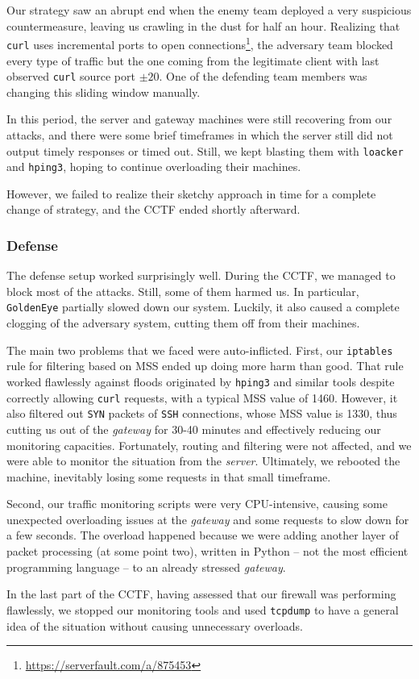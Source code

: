 Our strategy saw an abrupt end when the enemy team deployed a very suspicious countermeasure, leaving us crawling in the dust for half an hour. Realizing that \texttt{curl} uses incremental ports to open connections\footnote{\url{https://serverfault.com/a/875453}}, the adversary team blocked every type of traffic but the one coming from the legitimate client with last observed \texttt{curl} source port $\pm 20$. One of the defending team members was changing this sliding window manually. 

In this period, the server and gateway machines were still recovering from our attacks, and there were some brief timeframes in which the server still did not output timely responses or timed out. Still, we kept blasting them with \texttt{loacker} and \texttt{hping3}, hoping to continue overloading their machines.

However, we failed to realize their sketchy approach in time for a complete change of strategy, and the CCTF ended shortly afterward.

\subsubsection{Defense}
\label{sec:cctf-resilient:exec:def}

The defense setup worked surprisingly well. During the CCTF, we managed to block most of the attacks. Still, some of them harmed us. In particular, \texttt{GoldenEye} partially slowed down our system. Luckily, it also caused a complete clogging of the adversary system, cutting them off from their machines.

The main two problems that we faced were auto-inflicted. First, our \texttt{iptables} rule for filtering based on MSS ended up doing more harm than good. That rule worked flawlessly against floods originated by \texttt{hping3} and similar tools despite correctly allowing \texttt{curl} requests, with a typical MSS value of 1460. However, it also filtered out \texttt{SYN} packets of \texttt{SSH} connections, whose MSS value is 1330, thus cutting us out of the \textit{gateway} for 30-40 minutes and effectively reducing our monitoring capacities. Fortunately, routing and filtering were not affected, and we were able to monitor the situation from the \textit{server}. Ultimately, we rebooted the machine, inevitably losing some requests in that small timeframe.

Second, our traffic monitoring scripts were very CPU-intensive, causing some unexpected overloading issues at the \textit{gateway} and some requests to slow down for a few seconds.
The overload happened because we were adding another layer of packet processing (at some point two), written in Python -- not the most efficient programming language -- to an already stressed \textit{gateway}.

In the last part of the CCTF, having assessed that our firewall was performing flawlessly, we stopped our monitoring tools and used \texttt{tcpdump} to have a general idea of the situation without causing unnecessary overloads.

\clearpage
\newpage